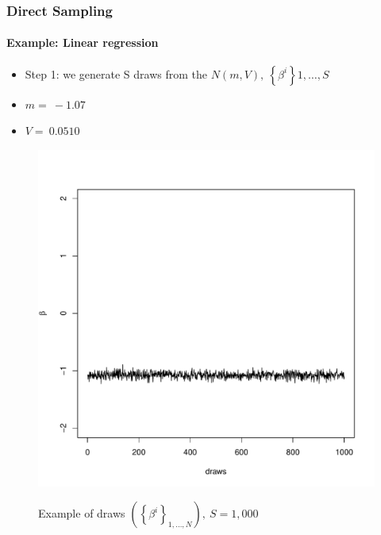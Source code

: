 \documentclass[
  shownotes,
  xcolor={svgnames},
  hyperref={colorlinks,citecolor=DarkBlue,linkcolor=DarkRed,urlcolor=DarkBlue}
  , aspectratio=169]{beamer}
\begin{document}
\begin{frame}[fragile]
\frametitle{Direct Sampling}  
\framesubtitle{Example: Linear regression}
\begin{itemize}
\item Step 1: we generate S draws from the $N\left( m,V \right),\ \left\{ \beta^{i} \right\} 1,\ldots,S$
\item $m = \  - 1.07$
\item $V = \ 0.0510$
\end{itemize}

\begin{figure}[H] \centering
  \centering
  \caption{Example of draws $\left( \left\{ \beta^{i} \right\}_{1,\ldots,N} \right),\ S = 1,000$}
  \includegraphics[scale=0.25]{figures/beta}
  \\
  \tiny 
\end{figure}

  
\end{frame}
\end{document}
